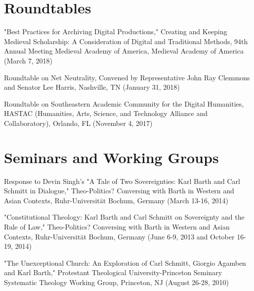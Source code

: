 \documentclass[10pt]{res} %
\begin{document}
\begin{resume}
\section{Roundtables}

\begin{hangparas}{.25in}{1}"Best Practices for Archiving Digital Productions," Creating and Keeping Medieval Scholarship: A Consideration of Digital and Traditional Methods, 94th Annual Meeting Medieval Academy of America, Medieval Academy of America (March 7, 2018)\end{hangparas}

\begin{hangparas}{.25in}{1}Roundtable on Net Neutrality, Convened by Representative John Ray Clemmons and Senator Lee Harris, Nashville, TN (January 31, 2018)\end{hangparas}

\begin{hangparas}{.25in}{1}Roundtable on Southeastern Academic Community for the Digital Humanities, HASTAC (Humanities, Arts, Science, and Technology Alliance and Collaboratory), Orlando, FL (November 4, 2017)\end{hangparas}

\section{Seminars and Working Groups}

\begin{hangparas}{.25in}{1}Response to Devin Singh’s "A Tale of Two Sovereignties: Karl Barth and Carl Schmitt in Dialogue," Theo-Politics? Conversing with Barth in Western and Asian Contexts, Ruhr-Universität Bochum, Germany (March 13-16, 2014)\end{hangparas}

\begin{hangparas}{.25in}{1}"Constitutional Theology: Karl Barth and Carl Schmitt on Sovereignty and the Rule of Law," Theo-Politics? Conversing with Barth in Western and Asian Contexts, Ruhr-Universität Bochum, Germany (June 6-9, 2013 and October 16-19, 2014)\end{hangparas}

\begin{hangparas}{.25in}{1}"The Unexceptional Church: An Exploration of Carl Schmitt, Giorgio Agamben and Karl Barth," Protestant Theological University-Princeton Seminary Systematic Theology Working Group, Princeton, NJ (August 26-28, 2010)\end{hangparas}


\end{resume}
\end{document}
